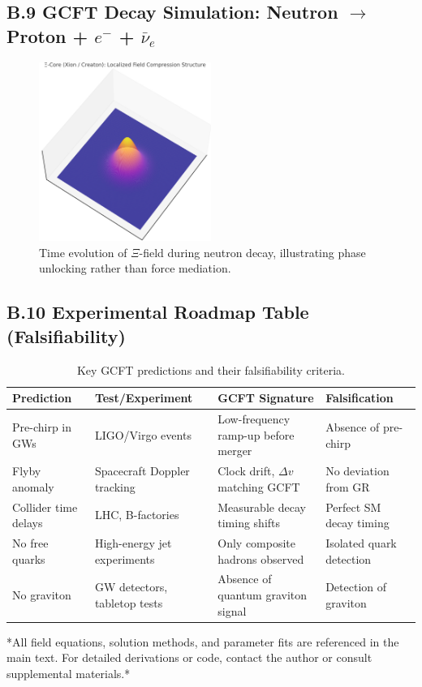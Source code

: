 \subsection*{B.9 GCFT Decay Simulation: Neutron $\rightarrow$ Proton + $e^-$ + $\bar{\nu}_e$}

\begin{figure}[H]
\centering
\includegraphics[width=0.5\textwidth]{figures/xi_core_modulus_surface.png}
\caption{Time evolution of $\Xi$-field during neutron decay, illustrating phase unlocking rather than force mediation.}
\end{figure}

\subsection*{B.10 Experimental Roadmap Table (Falsifiability)}

\begin{table}[H]
\small
\centering
\begin{tabular}{p{3cm} p{3cm} p{4cm} p{4cm}}
\hline
\textbf{Prediction} & \textbf{Test/Experiment} & \textbf{GCFT Signature} & \textbf{Falsification} \\
\hline
Pre-chirp in GWs & LIGO/Virgo events & Low-frequency ramp-up before merger & Absence of pre-chirp \\
Flyby anomaly & Spacecraft Doppler tracking & Clock drift, $\Delta v$ matching GCFT & No deviation from GR \\
Collider time delays & LHC, B-factories & Measurable decay timing shifts & Perfect SM decay timing \\
No free quarks & High-energy jet experiments & Only composite hadrons observed & Isolated quark detection \\
No graviton & GW detectors, tabletop tests & Absence of quantum graviton signal & Detection of graviton \\
\hline
\end{tabular}
\caption{Key GCFT predictions and their falsifiability criteria.}
\label{tab:gcft_falsification}
\end{table}



\vspace{1em}

*All field equations, solution methods, and parameter fits are referenced in the main text. For detailed derivations or code, contact the author or consult supplemental materials.*

